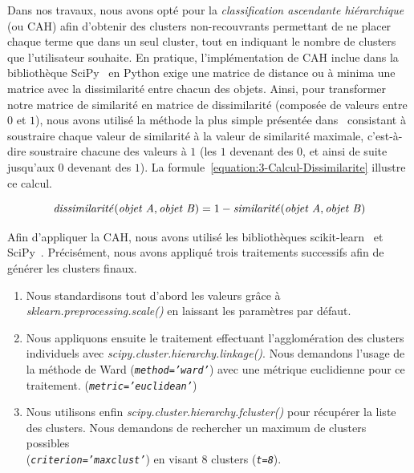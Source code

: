 \bigskip

Dans nos travaux, nous avons opté pour la \textit{classification ascendante hiérarchique} (ou CAH) afin d'obtenir des clusters non-recouvrants permettant de ne placer chaque terme que dans un seul cluster, tout en indiquant le nombre de clusters que l'utilisateur souhaite.
En pratique, l'implémentation de CAH inclue dans la bibliothèque SciPy~\cite{2020SciPy-NMeth} en Python exige une matrice de distance ou à minima une matrice avec la dissimilarité entre chacun des objets.
Ainsi, pour transformer notre matrice de similarité en matrice de dissimilarité (composée de valeurs entre $ 0 $ et $ 1 $), nous avons utilisé la méthode la plus simple présentée dans~\cite{rakotomalala2020pratique} consistant à soustraire chaque valeur de similarité à la valeur de similarité maximale, c'est-à-dire soustraire chacune des valeurs à $ 1 $ (les $ 1 $ devenant des $ 0 $, et ainsi de suite jusqu'aux $ 0 $ devenant des $ 1 $).
La formule~\eqref{equation:3-Calcul-Dissimilarite} illustre ce calcul.

\begin{equation}
\text{\textit{dissimilarité}}(\text{\textit{objet A}}, \text{\textit{objet B}}) = 1 - \text{\textit{similarité}}(\text{\textit{objet A}}, \text{\textit{objet B}})
\label{equation:3-Calcul-Dissimilarite}
\end{equation}


\bigskip

Afin d'appliquer la CAH, nous avons utilisé les bibliothèques scikit-learn~\cite{scikit-learn} et SciPy~\cite{2020SciPy-NMeth}.
Précisément, nous avons appliqué trois traitements successifs afin de générer les clusters finaux.
\begin{enumerate}
\item Nous standardisons tout d'abord les valeurs grâce à \textit{sklearn.preprocessing.scale()} en laissant les paramètres par défaut.
\item Nous appliquons ensuite le traitement effectuant l'agglomération des clusters individuels avec \textit{scipy.cluster.hierarchy.linkage()}.
Nous demandons l'usage de la méthode de Ward (\texttt{\textit{method='ward'}}) avec une métrique euclidienne pour ce traitement. (\texttt{\textit{metric='euclidean'}})
\item Nous utilisons enfin \textit{scipy.cluster.hierarchy.fcluster()} pour récupérer la liste des clusters.
Nous demandons de rechercher un maximum de clusters possibles \\ (\texttt{\textit{criterion='maxclust'}}) en visant 8 clusters (\texttt{\textit{t=8}}).
\end{enumerate}

